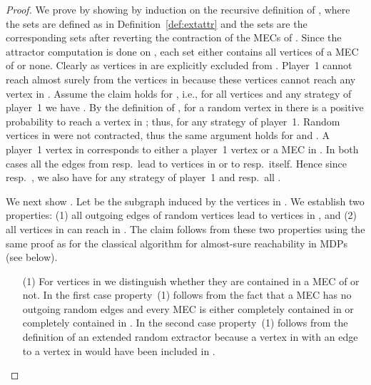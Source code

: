\documentclass[11pt,letterpaper]{article}
\begin{document}
{\begin{proof}
We prove   by showing  by induction on the 
recursive definition of , where the sets  are defined as in 
Definition~\ref{def:extattr} and the sets  are the corresponding
sets after reverting the contraction of the MECs of . Since the attractor
computation is done on , each
set  either contains all vertices of a MEC of  or none.
Clearly  as vertices
in  are explicitly excluded from .
Player~1 cannot reach  almost surely from the vertices in
 because these vertices cannot reach any vertex in 
. Assume the claim holds for , i.e., for all vertices 
and any strategy  of player~1 we have . 
By the definition of , for a random vertex  in 
there is a positive probability to reach a vertex in ; thus, 
 for any strategy  
of player~1. Random vertices in  were not contracted, thus the same
argument holds for  and . 
A player~1 vertex  in  corresponds to either a 
player~1 vertex  or a MEC  in . In both cases
all the edges from  resp.\  lead to vertices in  or to 
resp.\  itself. Hence since  resp.\ , we also have  for any strategy  of player~1 and  resp.\ all . 
\smallskip

We next show .
Let  be the subgraph induced by 
the vertices in .
We establish two properties:
(1) all outgoing edges of random vertices   lead to vertices in , and
(2) all vertices in  can reach  in .
The claim follows from these two properties using the same proof as for the 
classical algorithm for almost-sure reachability in MDPs (see below).

\begin{enumerate}
  \item[(1)] For vertices in  we distinguish whether they are contained in a MEC of 
	or not. In the first case property~(1) follows from the fact that a MEC has no
	outgoing random edges and every MEC is either completely contained in 
	or completely contained in .
	In the second case property~(1) follows from the definition of an extended 
	random extractor because a vertex in  with an edge to a vertex in 
	 would have been included in .


\end{enumerate}
\end{proof}}
\end{document}
